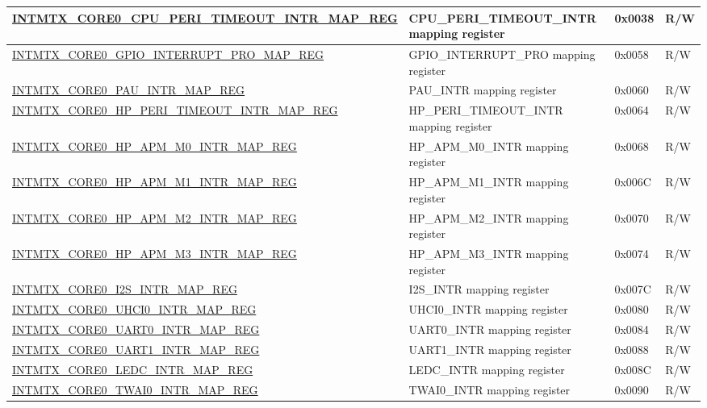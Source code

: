 \begin{longtable}{ | p{10cm} | p{10cm} | p{1.3cm} | p{1cm} | }
\hyperref[regdesc:INTMTXCORE0CPUPERITIMEOUTINTRMAPREG]{INTMTX\_CORE0\_CPU\_PERI\_TIMEOUT\_INTR\_MAP\_REG} & CPU\_PERI\_TIMEOUT\_INTR mapping register & 0x0038 & R/W \\ \hline
\hyperref[regdesc:INTMTXCORE0GPIOINTERRUPTPROMAPREG]{INTMTX\_CORE0\_GPIO\_INTERRUPT\_PRO\_MAP\_REG} & GPIO\_INTERRUPT\_PRO mapping register & 0x0058 & R/W \\ \hline
\hyperref[regdesc:INTMTXCORE0PAUINTRMAPREG]{INTMTX\_CORE0\_PAU\_INTR\_MAP\_REG} & PAU\_INTR mapping register & 0x0060 & R/W \\ \hline
\hyperref[regdesc:INTMTXCORE0HPPERITIMEOUTINTRMAPREG]{INTMTX\_CORE0\_HP\_PERI\_TIMEOUT\_INTR\_MAP\_REG} & HP\_PERI\_TIMEOUT\_INTR mapping register & 0x0064 & R/W \\ \hline
\hyperref[regdesc:INTMTXCORE0HPAPMM0INTRMAPREG]{INTMTX\_CORE0\_HP\_APM\_M0\_INTR\_MAP\_REG} & HP\_APM\_M0\_INTR mapping register & 0x0068 & R/W \\ \hline
\hyperref[regdesc:INTMTXCORE0HPAPMM1INTRMAPREG]{INTMTX\_CORE0\_HP\_APM\_M1\_INTR\_MAP\_REG} & HP\_APM\_M1\_INTR mapping register & 0x006C & R/W \\ \hline
\hyperref[regdesc:INTMTXCORE0HPAPMM2INTRMAPREG]{INTMTX\_CORE0\_HP\_APM\_M2\_INTR\_MAP\_REG} & HP\_APM\_M2\_INTR mapping register & 0x0070 & R/W \\ \hline
\hyperref[regdesc:INTMTXCORE0HPAPMM3INTRMAPREG]{INTMTX\_CORE0\_HP\_APM\_M3\_INTR\_MAP\_REG} & HP\_APM\_M3\_INTR mapping register & 0x0074 & R/W \\ \hline
\hyperref[regdesc:INTMTXCORE0I2SINTRMAPREG]{INTMTX\_CORE0\_I2S\_INTR\_MAP\_REG} & I2S\_INTR mapping register & 0x007C & R/W \\ \hline
\hyperref[regdesc:INTMTXCORE0UHCI0INTRMAPREG]{INTMTX\_CORE0\_UHCI0\_INTR\_MAP\_REG} & UHCI0\_INTR mapping register & 0x0080 & R/W \\ \hline
\hyperref[regdesc:INTMTXCORE0UART0INTRMAPREG]{INTMTX\_CORE0\_UART0\_INTR\_MAP\_REG} & UART0\_INTR mapping register & 0x0084 & R/W \\ \hline
\hyperref[regdesc:INTMTXCORE0UART1INTRMAPREG]{INTMTX\_CORE0\_UART1\_INTR\_MAP\_REG} & UART1\_INTR mapping register & 0x0088 & R/W \\ \hline
\hyperref[regdesc:INTMTXCORE0LEDCINTRMAPREG]{INTMTX\_CORE0\_LEDC\_INTR\_MAP\_REG} & LEDC\_INTR mapping register & 0x008C & R/W \\ \hline
\hyperref[regdesc:INTMTXCORE0TWAI0INTRMAPREG]{INTMTX\_CORE0\_TWAI0\_INTR\_MAP\_REG} & TWAI0\_INTR mapping register & 0x0090 & R/W \\ \hline

\end{longtable}
